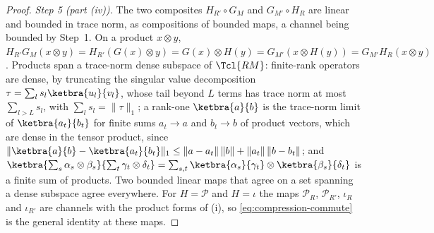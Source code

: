 \begin{proof}
\emph{Step 5 (part (iv)).} The two composites $H_{R'}\circ G_M$ and
$G_{M'}\circ H_R$ are linear and bounded in trace norm, as compositions of
bounded maps, a channel being bounded by
Step~1. On a product $x\otimes y$,
$H_{R'}G_M(x\otimes y)=H_{R'}(G(x)\otimes y)=G(x)\otimes H(y)
=G_{M'}(x\otimes H(y))=G_{M'}H_R(x\otimes y)$.
Products span a trace-norm dense subspace of $\Tcl{RM}$: finite-rank operators are dense, by truncating the
singular value decomposition $\tau=\sum_ls_l\ketbra{u_l}{v_l}$, whose tail
beyond $L$ terms has trace norm at most $\sum_{l>L}s_l$, with
$\sum_ls_l=\|\tau\|_1$; a rank-one $\ketbra{a}{b}$ is the trace-norm limit of
$\ketbra{a_t}{b_t}$ for finite sums $a_t\to a$ and $b_t\to b$ of product
vectors, which are dense in the tensor product, since
$\|\ketbra{a}{b}-\ketbra{a_t}{b_t}\|_1\le\|a-a_t\|\,\|b\|+\|a_t\|\,\|b-b_t\|$;
and $\ketbra{\sum_s\alpha_s\otimes\beta_s}{\sum_t\gamma_t\otimes\delta_t}
=\sum_{s,t}\ketbra{\alpha_s}{\gamma_t}\otimes\ketbra{\beta_s}{\delta_t}$ is a
finite sum of products. Two bounded linear maps that agree on a set spanning
a dense subspace agree everywhere. For $H=\mathcal{P}$ and $H=\iota$ the
maps $\mathcal{P}_R$, $\mathcal{P}_{R'}$, $\iota_R$ and $\iota_{R'}$ are
channels with the product forms of (i), so \eqref{eq:compression-commute} is
the general identity at these maps.


\end{proof}
